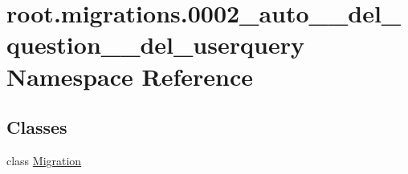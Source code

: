 \hypertarget{namespaceroot_1_1migrations_1_10002__auto____del__question____del__userquery}{\section{root.\-migrations.0002\-\_\-auto\-\_\-\-\_\-del\-\_\-question\-\_\-\-\_\-del\-\_\-userquery Namespace Reference}
\label{namespaceroot_1_1migrations_1_10002__auto____del__question____del__userquery}
}
\subsection*{Classes}
\begin{DoxyCompactItemize}
\item 
class \hyperlink{classroot_1_1migrations_1_10002__auto____del__question____del__userquery_1_1_migration}{Migration}
\end{DoxyCompactItemize}
